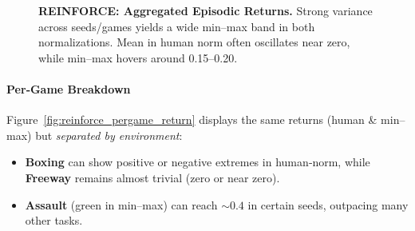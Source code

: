 \begin{figure}[htbp]
	\centering
	\quad
	\caption{\textbf{REINFORCE: Aggregated Episodic Returns.} 
		Strong variance across seeds/games yields a wide min--max band in both normalizations. 
		Mean in human norm often oscillates near zero, while min--max hovers around 0.15--0.20.}
	\label{fig:reinforce_returns_agg}
\end{figure}

\paragraph{Per‐Game Breakdown}
Figure~\ref{fig:reinforce_pergame_return} displays the same returns (human \& min--max) 
but \emph{separated by environment}:
\begin{itemize}
	\item \textbf{Boxing} can show positive or negative extremes in human‐norm,
	while \textbf{Freeway} remains almost trivial (zero or near zero).
	\item \textbf{Assault} (green in min--max) can reach $\sim0.4$ in certain seeds,
	outpacing many other tasks.
\end{itemize}

